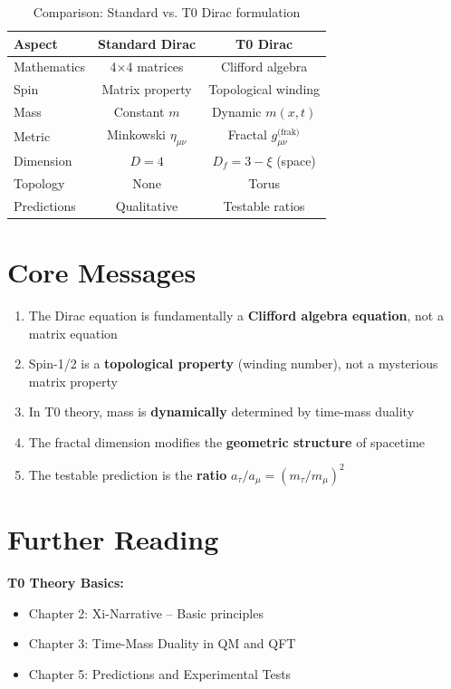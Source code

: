 	\begin{table}[h]
		\centering
		\begin{tabular}{lcc}
			\toprule
			\textbf{Aspect} & \textbf{Standard Dirac} & \textbf{T0 Dirac} \\
			\midrule
			Mathematics & 4×4 matrices & Clifford algebra \\
			Spin & Matrix property & Topological winding \\
			Mass & Constant $m$ & Dynamic $m(x,t)$ \\
			Metric & Minkowski $\eta_{\mu\nu}$ & Fractal $g_{\mu\nu}^{\text{(frak)}}$ \\
			Dimension & $D = 4$ & $D_f = 3 - \xi$ (space) \\
			Topology & None & Torus \\
			Predictions & Qualitative & Testable ratios \\
			\bottomrule
		\end{tabular}
		\caption{Comparison: Standard vs. T0 Dirac formulation}
	\end{table}
	
	\section{Core Messages}
	
	\begin{enumerate}
		\item The Dirac equation is fundamentally a \textbf{Clifford algebra equation}, 
		not a matrix equation
		
		\item Spin-1/2 is a \textbf{topological property} (winding number), 
		not a mysterious matrix property
		
		\item In T0 theory, mass is \textbf{dynamically} determined by 
		time-mass duality
		
		\item The fractal dimension modifies the \textbf{geometric structure} 
		of spacetime
		
		\item The testable prediction is the \textbf{ratio} 
		$a_\tau/a_\mu = (m_\tau/m_\mu)^2$
	\end{enumerate}
	
	\section*{Further Reading}
	
	\textbf{T0 Theory Basics:}
	\begin{itemize}
		\item Chapter 2: Xi-Narrative -- Basic principles
		\item Chapter 3: Time-Mass Duality in QM and QFT
		\item Chapter 5: Predictions and Experimental Tests
	\end{itemize}
	
